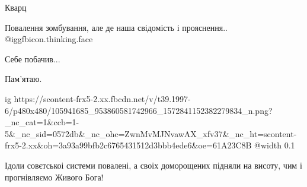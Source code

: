 Кварц

Повалення зомбування, але де наша свідомість і прояснення.. @igg{fbicon.thinking.face} 

Себе побачив...

Пам'ятаю.


\ifcmt
  ig https://scontent-frx5-2.xx.fbcdn.net/v/t39.1997-6/p480x480/105941685_953860581742966_1572841152382279834_n.png?_nc_cat=1&ccb=1-5&_nc_sid=0572db&_nc_ohc=ZwnMvMJNvawAX_xfv37&_nc_ht=scontent-frx5-2.xx&oh=3a93a99bfb2c6765431512d3bbb4ede6&oe=61A23C8B
  @width 0.1
\fi


Ідоли совєтськоі системи повалені, а своіх доморощених підняли на висоту, чим і
прогнівляємо Живого Бога!
